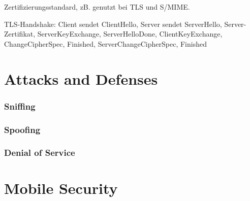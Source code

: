 \documentclass{article}
\begin{document}

Zertifizierungsstandard, zB. genutzt bei TLS und S/MIME.

TLS-Handshake: Client sendet ClientHello, Server sendet ServerHello, Server-Zertifikat, ServerKeyExchange, ServerHelloDone, ClientKeyExchange, ChangeCipherSpec, Finished, ServerChangeCipherSpec, Finished




\part{Attacks and Defenses}

\section{Sniffing}

\section{Spoofing}

\section{Denial of Service}




\part{Mobile Security}
\end{document}
